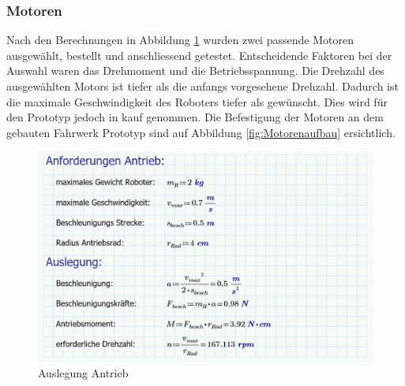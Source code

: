 \subsubsection*{Motoren}


Nach den Berechnungen in Abbildung \ref{fig:Auslegung_Antrieb}  wurden zwei passende Motoren ausgewählt, bestellt und anschliessend getestet. Entscheidende Faktoren bei der Auswahl waren das Drehmoment und die Betriebsspannung. Die Drehzahl des ausgewählten Motors ist tiefer als die anfangs vorgesehene Drehzahl. Dadurch ist die maximale Geschwindigkeit des Roboters tiefer als gewünscht. Dies wird für den Prototyp jedoch in kauf genommen. Die Befestigung der Motoren an dem gebauten Fahrwerk Prototyp sind auf Abbildung \ref{fig:Motorenaufbau} ersichtlich.

\begin{figure}[H]
    \centering
    \includegraphics[width=0.8\linewidth]{img/Auslegung_Antrieb.PNG}
    \caption{Auslegung Antrieb}
    \label{fig:Auslegung_Antrieb}
\end{figure}

